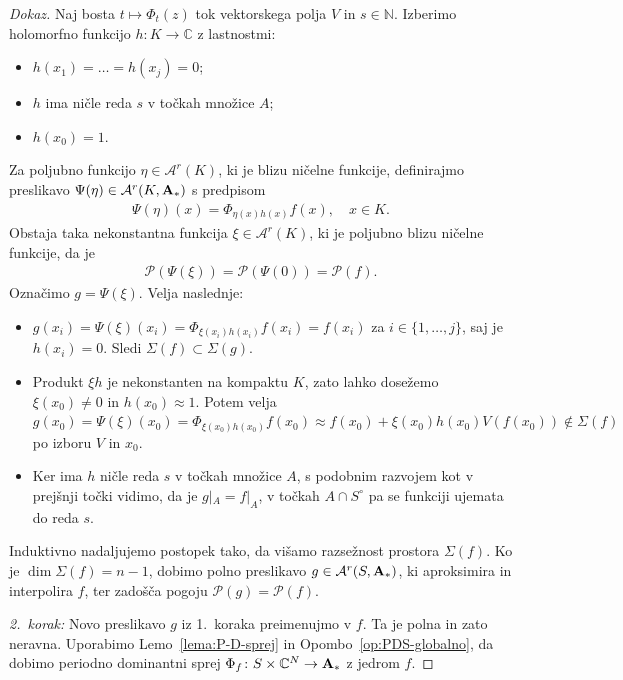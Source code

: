 \documentclass[12pt,a4paper,twoside]{article}
\theoremstyle{definition} %
\newenvironment{dokaz}[1][Dokaz]{\begin{proof}[#1]}{\end{proof}}
\theoremstyle{plain} %
\numberwithin{equation}{section}  %
\begin{document}
\begin{dokaz}
Naj bosta $t \mapsto \Phi_{t}(z)$ tok vektorskega polja $V$ in $s \in \mathbb{N}$. 
Izberimo holomorfno funkcijo $h \colon K \to \mathbb{C}$ z lastnostmi:
\begin{itemize}
\item $h(x_{1}) = \dots = h(x_{j}) = 0$;
\item $h$ ima ničle reda $s$ v točkah množice $A$;
\item $h(x_0) = 1$.
\end{itemize}
Za poljubno funkcijo $\eta \in \mathcal{A}^{r}(K)$, ki je blizu ničelne funkcije, definirajmo preslikavo $\Psi (\eta) \in \mathcal{A}^{r}(K, \textbf{\textup{A}}_{*})$ s predpisom
\begin{gather}
\Psi (\eta)(x) = \Phi _{\eta(x) h(x)} f(x), \quad x \in K.
\end{gather}
Obstaja taka nekonstantna funkcija $\xi \in \mathcal{A}^{r}(K)$, ki je poljubno blizu ničelne funkcije, da je
\begin{gather*}
\mathcal{P}(\Psi (\xi)) = \mathcal{P}(\Psi(0)) = \mathcal{P}(f).
\end{gather*}
Označimo $g = \Psi(\xi)$. Velja naslednje:
\begin{itemize}
\item $g(x_{i}) = \Psi(\xi)(x_{i}) = \Phi_{\xi(x_{i}) h(x_{i})} f(x_{i}) = f(x_{i})$ za $i \in \{1, \dots , j \}$, saj je $h(x_{i})=0$. Sledi 
	$\Sigma(f) \subset \Sigma(g)$.
\item Produkt $\xi h$ je nekonstanten na kompaktu $K$, zato lahko dosežemo $\xi (x_0) \neq 0$ in $h(x_0) \approx 1.$ Potem velja
	$g(x_0) = \Psi(\xi)(x_0) = \Phi_{\xi(x_0) h(x_0)} f(x_0) \approx f(x_0) + \xi(x_0) h(x_0) V(f(x_0)) \notin \Sigma(f)$ po izboru $V$ in $x_0$.
\item Ker ima $h$ ničle reda $s$ v točkah množice $A$, s podobnim razvojem kot v prejšnji točki vidimo, da je $g|_{A} = f|_{A}$, v točkah $A \cap S^{\circ}$ pa se funkciji ujemata do reda $s$.
\end{itemize}
Induktivno nadaljujemo postopek tako, da višamo razsežnost prostora $\Sigma(f)$. Ko je $\dim \Sigma(f) = n-1$, dobimo polno preslikavo $g \in \mathcal{A}^{r}(S, \textbf{\textup{A}}_{*})$, ki aproksimira in interpolira $f$, ter zadošča pogoju $\mathcal{P}(g) = \mathcal{P}(f)$. \newline

\textit{2.~korak:} Novo preslikavo $g$ iz 1.~koraka preimenujmo v $f$. Ta je polna in zato neravna.
Uporabimo Lemo~\ref{lema:P-D-sprej} in Opombo~\ref{op:PDS-globalno}, da dobimo periodno dominantni sprej $\Phi_{f} \colon S \times \mathbb{C}^{N} \to \textbf{\textup{A}}_{*}$ z jedrom $f$.


\end{dokaz}
\end{document}
